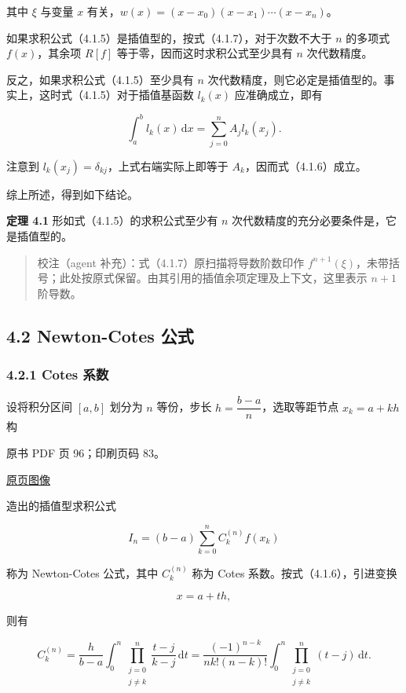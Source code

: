 其中 \(\xi\) 与变量 \(x\) 有关，\(w(x)=(x-x_0)(x-x_1)\cdots(x-x_n)\)。

如果求积公式（4.1.5）是插值型的，按式（4.1.7），对于次数不大于 \(n\) 的多项式 \(f(x)\)，其余项 \(R[f]\) 等于零，因而这时求积公式至少具有 \(n\) 次代数精度。

反之，如果求积公式（4.1.5）至少具有 \(n\) 次代数精度，则它必定是插值型的。事实上，这时式（4.1.5）对于插值基函数 \(l_k(x)\) 应准确成立，即有

\[
\int_a^b l_k(x)\,\mathrm{d}x=\sum_{j=0}^n A_jl_k(x_j).
\]

注意到 \(l_k(x_j)=\delta_{kj}\)，上式右端实际上即等于 \(A_k\)，因而式（4.1.6）成立。

综上所述，得到如下结论。

\textbf{定理 4.1} 形如式（4.1.5）的求积公式至少有 \(n\) 次代数精度的充分必要条件是，它是插值型的。

\begin{quote}
校注（agent 补充）：式（4.1.7）原扫描将导数阶数印作 \(f^{n+1}(\xi)\)，未带括号；此处按原式保留。由其引用的插值余项定理及上下文，这里表示 \(n+1\) 阶导数。
\end{quote}

\subsection{4.2 Newton-Cotes 公式}\label{ch04a-newton-cotes-ux516cux5f0f}

\subsubsection{4.2.1 Cotes 系数}\label{ch04a-cotes-ux7cfbux6570}

设将积分区间 \([a,b]\) 划分为 \(n\) 等份，步长 \(h=\dfrac{b-a}{n}\)，选取等距节点 \(x_k=a+kh\) 构

\clearpage

原书 PDF 页 96；印刷页码 83。

\href{source-images/pdf-096.jpeg}{原页图像}

造出的插值型求积公式

\[
I_n=(b-a)\sum_{k=0}^n C_k^{(n)}f(x_k)
\tag{4.2.1}
\]

称为 Newton-Cotes 公式，其中 \(C_k^{(n)}\) 称为 Cotes 系数。按式（4.1.6），引进变换

\[
x=a+th,
\]

则有

\[
C_k^{(n)}=\frac{h}{b-a}\int_0^n\prod_{\substack{j=0\\j\ne k}}^n\frac{t-j}{k-j}\,\mathrm{d}t
=\frac{(-1)^{n-k}}{nk!(n-k)!}\int_0^n\prod_{\substack{j=0\\j\ne k}}^n(t-j)\,\mathrm{d}t.
\tag{4.2.2}
\]

